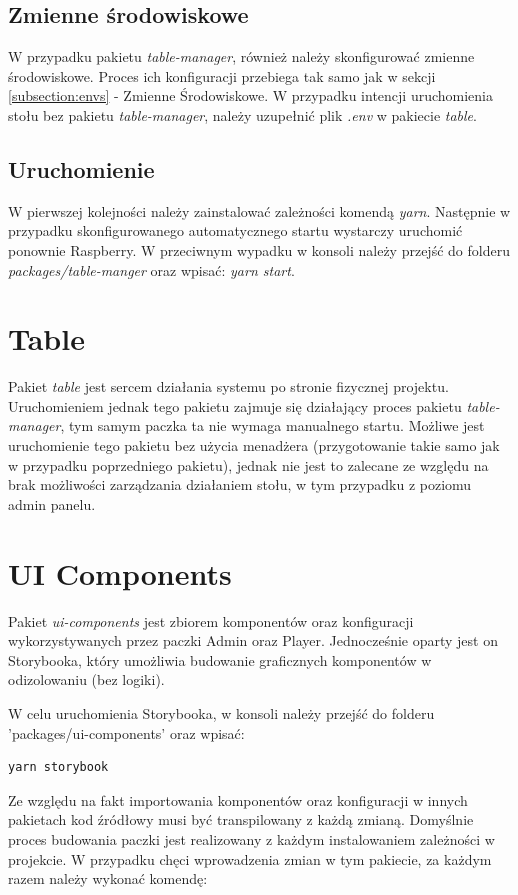 \subsection{Zmienne środowiskowe}
W przypadku pakietu \textit{table-manager}, również należy skonfigurować zmienne środowiskowe. Proces ich konfiguracji przebiega tak samo jak w sekcji \ref{subsection:envs} - Zmienne Środowiskowe. W przypadku intencji uruchomienia stołu bez pakietu \textit{table-manager}, należy uzupełnić plik \textit{.env} w pakiecie \textit{table}.

\subsection{Uruchomienie}
W pierwszej kolejności należy zainstalować zależności komendą \textit{yarn}. Następnie w przypadku skonfigurowanego automatycznego startu wystarczy uruchomić ponownie Raspberry. W przeciwnym wypadku w konsoli należy przejść do folderu \textit{packages/table-manger} oraz wpisać: \textit{yarn start}.

\section{Table}
Pakiet \textit{table} jest sercem działania systemu po stronie fizycznej projektu. Uruchomieniem jednak tego pakietu zajmuje się działający proces pakietu \textit{table-manager}, tym samym paczka ta nie wymaga manualnego startu. Możliwe jest uruchomienie tego pakietu bez użycia menadżera (przygotowanie takie samo jak w przypadku poprzedniego pakietu), jednak nie jest to zalecane ze względu na brak możliwości zarządzania działaniem stołu, w tym przypadku z poziomu admin panelu.

\section{UI Components}
Pakiet \textit{ui-components} jest zbiorem komponentów oraz konfiguracji wykorzystywanych przez paczki Admin oraz Player. Jednocześnie oparty jest on Storybooka, który umożliwia budowanie graficznych komponentów w odizolowaniu (bez logiki).

W celu uruchomienia Storybooka, w konsoli należy przejść do folderu 'packages/ui-components' oraz wpisać:

\begin{lstlisting}
yarn storybook
\end{lstlisting}

Ze względu na fakt importowania komponentów oraz konfiguracji w innych pakietach kod źródłowy musi być transpilowany z każdą zmianą. Domyślnie proces budowania paczki jest realizowany z każdym instalowaniem zależności w projekcie. W przypadku chęci wprowadzenia zmian w tym pakiecie, za każdym razem należy wykonać komendę:

